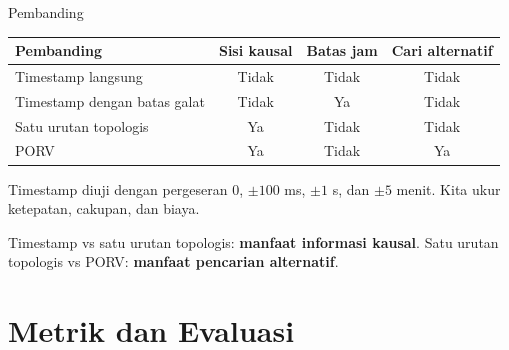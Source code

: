 \documentclass[11pt,aspectratio=169,t]{beamer}
\begin{document}
\begin{frame}{Pembanding}
\small
\renewcommand{\arraystretch}{1.25}
\begin{tabularx}{\textwidth}{@{}Xccc@{}}
\toprule
Pembanding & Sisi kausal & Batas jam & Cari alternatif \\
\midrule
Timestamp langsung & Tidak & Tidak & Tidak \\
Timestamp dengan batas galat & Tidak & Ya & Tidak \\
Satu urutan topologis & Ya & Tidak & Tidak \\
PORV & Ya & Tidak & Ya \\
\bottomrule
\end{tabularx}
\medskip

Timestamp diuji dengan pergeseran 0, $\pm100$ ms, $\pm1$ s, dan $\pm5$ menit. Kita ukur ketepatan, cakupan, dan biaya.
\smallskip

\footnotesize Timestamp vs satu urutan topologis: \textbf{manfaat informasi kausal}. Satu urutan topologis vs PORV: \textbf{manfaat pencarian alternatif}.
\end{frame}

\section{Metrik dan Evaluasi}
\end{document}
